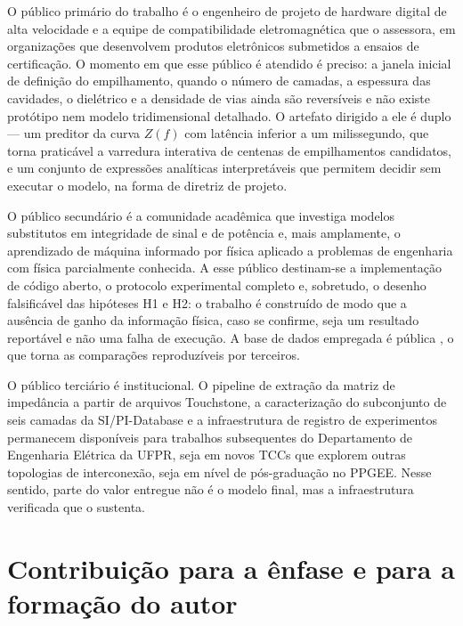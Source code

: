 O público primário do trabalho é o engenheiro de projeto de hardware digital de
alta velocidade e a equipe de compatibilidade eletromagnética que o assessora,
em organizações que desenvolvem produtos eletrônicos submetidos a ensaios de
certificação. O momento em que esse público é atendido é preciso: a janela
inicial de definição do empilhamento, quando o número de camadas, a espessura
das cavidades, o dielétrico e a densidade de vias ainda são reversíveis e não
existe protótipo nem modelo tridimensional detalhado. O artefato dirigido a ele
é duplo — um preditor da curva $Z(f)$ com latência inferior a um milissegundo,
que torna praticável a varredura interativa de centenas de empilhamentos
candidatos, e um conjunto de expressões analíticas interpretáveis que permitem
decidir sem executar o modelo, na forma de diretriz de projeto.

O público secundário é a comunidade acadêmica que investiga modelos substitutos
em integridade de sinal e de potência e, mais amplamente, o aprendizado de
máquina informado por física aplicado a problemas de engenharia com física
parcialmente conhecida. A esse público destinam-se a implementação de código
aberto, o protocolo experimental completo e, sobretudo, o desenho falsificável
das hipóteses H1 e H2: o trabalho é construído de modo que a ausência de ganho
da informação física, caso se confirme, seja um resultado reportável e não uma
falha de execução. A base de dados empregada é pública \citep{schierholz2021,
hillebrecht2024}, o que torna as comparações reproduzíveis por terceiros.

O público terciário é institucional. O pipeline de extração da matriz de
impedância a partir de arquivos Touchstone, a caracterização do subconjunto de
seis camadas da SI/PI-Database e a infraestrutura de registro de experimentos
permanecem disponíveis para trabalhos subsequentes do Departamento de
Engenharia Elétrica da UFPR, seja em novos TCCs que explorem outras topologias
de interconexão, seja em nível de pós-graduação no PPGEE. Nesse sentido, parte
do valor entregue não é o modelo final, mas a infraestrutura verificada que o
sustenta.

\section{Contribuição para a ênfase e para a formação do autor}
\label{sec:contribuicao}

